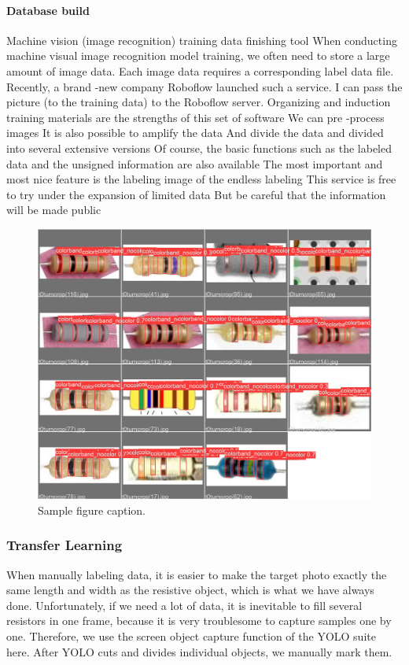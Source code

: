 \documentclass{article}
\begin{document}
\paragraph{Database build} Machine vision (image recognition) training data finishing tool
When conducting machine visual image recognition model training, we often need to store a large amount of image data. Each image data requires a corresponding label data file.
Recently, a brand -new company Roboflow launched such a service. I can pass the picture (to the training data) to the Roboflow server.
Organizing and induction training materials are the strengths of this set of software
We can pre -process images
It is also possible to amplify the data
And divide the data and divided into several extensive versions
Of course, the basic functions such as the labeled data and the unsigned information are also available
The most important and most nice feature is the labeling image of the endless labeling
This service is free to try under the expansion of limited data
But be careful that the information will be made public

\begin{figure}
	\centering
	\includegraphics[width=0.7\linewidth]{Iry4lIy.jpg}
	\caption{Sample figure caption.}
	\label{fig:Iry4lIy}
\end{figure}

\subsubsection{Transfer Learning}

When manually labeling data, it is easier to make the target photo exactly the same length and width as the resistive object, which is what we have always done. Unfortunately, if we need a lot of data, it is inevitable to fill several resistors in one frame, because it is very troublesome to capture samples one by one. Therefore, we use the screen object capture function of the YOLO suite here. After YOLO cuts and divides individual objects, we manually mark them.
\end{document}
